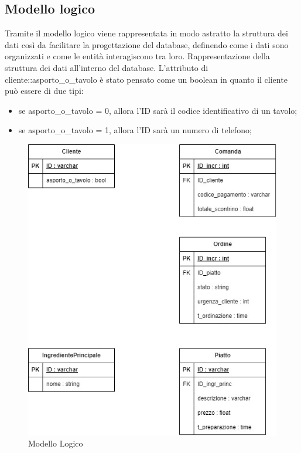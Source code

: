 \subsection{Modello logico}
Tramite il modello logico viene rappresentata in modo astratto la struttura dei dati così da facilitare la progettazione del database, definendo come i dati sono organizzati e come le entità interagiscono tra loro.
Rappresentazione della struttura dei dati all’interno del database. L’attributo di cliente::asporto\_o\_tavolo è stato pensato come un boolean in quanto il cliente può essere di due tipi:
\begin{itemize}
	\item se asporto\_o\_tavolo = 0, allora l’ID sarà il codice identificativo di un tavolo;
	\item se asporto\_o\_tavolo = 1, allora l’ID sarà un numero di telefono;
\end{itemize}

\begin{figure}[htbp]
	\centering
	\includegraphics[scale=0.5]{iterazione1/images/database_modello_logico.jpg}
	\caption{Modello Logico\label{fig:modello_logico}}
\end{figure}

